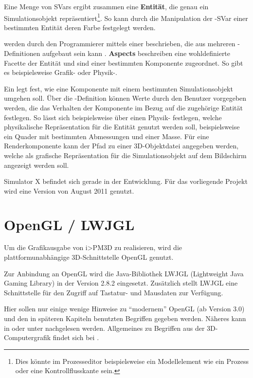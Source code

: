 \documentclass[a4paper,10pt]{sphinxmanual}
\begin{document}
Eine Menge von SVars ergibt zusammen eine \textbf{Entität}, die genau ein Simulationsobjekt repräsentiert\footnote{
Dies könnte im Prozesseditor beispielsweise ein Modellelement wie ein Prozess oder eine Kontrollflusskante sein.
}.
So kann durch die Manipulation der -SVar einer bestimmten Entität deren Farbe festgelegt werden.

 werden durch den Programmierer mittels einer  beschrieben, die aus mehreren -Definitionen aufgebaut sein kann \cite{wiebusch_enhanced_2012}.
\textbf{Aspects} beschreiben eine wohldefinierte Facette der Entität und sind einer bestimmten Komponente zugeordnet.
So gibt es beispielsweise Grafik- oder Physik-.

Ein  legt fest, wie eine Komponente mit einem bestimmten Simulationsobjekt umgehen soll.
Über die -Definition können Werte durch den Benutzer vorgegeben werden, die das Verhalten der Komponente im Bezug auf die zugehörige Entität festlegen.
So lässt sich beispielsweise über einen Physik- festlegen, welche physikalische Repräsentation für die Entität genutzt werden soll, beispielsweise ein Quader mit bestimmten Abmessungen und einer Masse.
Für eine Renderkomponente kann der Pfad zu einer 3D-Objektdatei angegeben werden, welche als grafische Repräsentation für die Simulationsobjekt auf dem Bildschirm angezeigt werden soll.

Simulator X befindet sich gerade in der Entwicklung. Für das vorliegende Projekt wird eine Version von August 2011 genutzt.


\section{OpenGL / LWJGL}
\label{verwendet:opengl-lwjgl}\label{verwendet:opengl}
Um die Grafikausgabe von i\textgreater{}PM3D zu realisieren, wird die plattformunabhängige 3D-Schnittstelle OpenGL \cite{opengl} genutzt.

Zur Anbindung an OpenGL wird die Java-Bibliothek LWJGL (Lightweight Java Gaming Library) \cite{www:lwjgl} in der Version 2.8.2 eingesetzt.
Zusätzlich stellt LWJGL eine Schnittstelle für den Zugriff auf Tastatur- und Mausdaten zur Verfügung.

Hier sollen nur einige wenige Hinweise zu "`modernem"' OpenGL (ab Version 3.0) und den in späteren Kapiteln benutzten Begriffen gegeben werden.
Näheres kann in \cite{wright_opengl_2010} oder unter \cite{opengl} nachgelesen werden.
Allgemeines zu Begriffen aus der 3D-Computergrafik findet sich bei \cite{akenine-moller_real-time_2008}.
\end{document}
